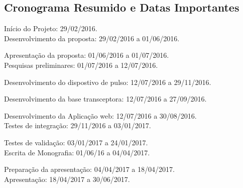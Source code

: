 \documentclass[a4paper]{article}
\begin{document}
\subsection{Cronograma Resumido e Datas Importantes}
Início do Projeto: 29/02/2016. \\

Desenvolvimento da proposta: 29/02/2016 a 01/06/2016. 

Apresentação da proposta: 01/06/2016 a 01/07/2016. \\

Pesquisas preliminares: 01/07/2016 a 12/07/2016.

Desenvolvimento do dispostivo de pulso: 12/07/2016 a 29/11/2016.

Desenvolvimento da base transceptora: 12/07/2016 a 27/09/2016.

Desenvolvimento da Aplicação web: 12/07/2016 a 30/08/2016. \\

Testes de integração: 29/11/2016 a 03/01/2017.

Testes de validação: 03/01/2017 a 24/01/2017. \\

Escrita de Monografia: 01/06/16 a 04/04/2017.

Preparação da apresentação: 04/04/2017 a 18/04/2017. \\

Apresentação: 18/04/2017 a 30/06/2017.
\end{document}
